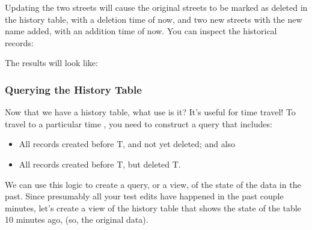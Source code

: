 \documentclass[a4paper,11pt,english]{sphinxmanual}
\begin{document}
Updating the two streets will cause the original streets to be marked as deleted in the history table, with a deletion time of now, and two new streets with the new name added, with an addition time of now. You can inspect the historical records:

\begin{sphinxVerbatim}[commandchars=\\\{\}]
       
\end{sphinxVerbatim}

The results will look like:
\begin{quote}

\noindent{}
\end{quote}


\subsubsection{Querying the History Table}
\label{\detokenize{advanced:querying-the-history-table}}
Now that we have a history table, what use is it? It’s useful for time travel! To travel to a particular time , you need to construct a query that includes:
\begin{itemize}
\item {} 
All records created before T, and not yet deleted; and also

\item {} 
All records created before T, but deleted  T.

\end{itemize}

We can use this logic to create a query, or a view, of the state of the data in the past. Since presumably all your test edits have happened in the past couple minutes, let’s create a view of the history table that shows the state of the table 10 minutes ago,  (so, the original data).
\end{document}
